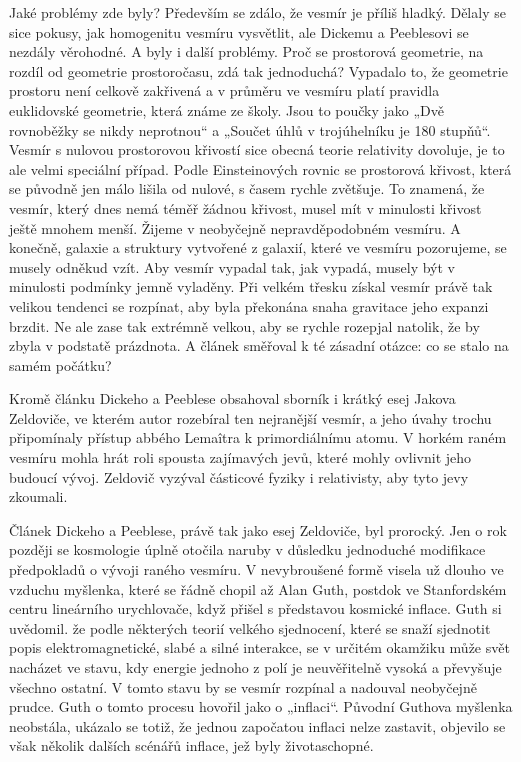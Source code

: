   Jaké problémy zde byly? Především se zdálo, že vesmír je příliš hladký. Dělaly se sice pokusy, jak
  homogenitu vesmíru vysvětlit, ale Dickemu a Peeblesovi se nezdály věrohodné. A byly i další
  problémy. Proč se prostorová geometrie, na rozdíl od geometrie prostoročasu, zdá tak jednoduchá?
  Vypadalo to, že geometrie prostoru není celkově zakřivená a v průměru ve vesmíru platí pravidla
  euklidovské geometrie, která známe ze školy. Jsou to poučky jako „Dvě rovnoběžky se nikdy
  neprotnou“ a „Součet úhlů v trojúhelníku je 180 stupňů“. Vesmír s nulovou prostorovou křivostí
  sice obecná teorie relativity dovoluje, je to ale velmi speciální případ. Podle Einsteinových
  rovnic se prostorová křivost, která se původně jen málo lišila od nulové, s časem rychle zvětšuje.
  To znamená, že vesmír, který dnes nemá téměř žádnou křivost, musel mít v minulosti křivost ještě
  mnohem menší. Žijeme v neobyčejně nepravděpodobném vesmíru. A konečně, galaxie a struktury
  vytvořené z galaxií, které ve vesmíru pozorujeme, se musely odněkud vzít. Aby vesmír vypadal tak,
  jak vypadá, musely být v minulosti podmínky jemně vyladěny. Při velkém třesku získal vesmír právě
  tak velikou tendenci se rozpínat, aby byla překonána snaha gravitace jeho expanzi brzdit. Ne ale
  zase tak extrémně velkou, aby se rychle rozepjal natolik, že by zbyla v podstatě prázdnota. A
  článek směřoval k té zásadní otázce: co se stalo na samém počátku? 
  
  Kromě článku Dickeho a Peeblese obsahoval sborník i krátký esej Jakova Zeldoviče, ve kterém autor
  rozebíral ten nejranější vesmír, a jeho úvahy trochu připomínaly přístup abbého Lemaîtra k
  primordiálnímu atomu. V horkém raném vesmíru mohla hrát roli spousta zajímavých jevů, které mohly
  ovlivnit jeho budoucí vývoj. Zeldovič vyzýval částicové fyziky i relativisty, aby tyto jevy
  zkoumali. 
  
  Článek Dickeho a Peeblese, právě tak jako esej Zeldoviče, byl prorocký. Jen o rok později se
  kosmologie úplně otočila naruby v důsledku jednoduché modifikace předpokladů o vývoji raného
  vesmíru. V nevybroušené formě visela už dlouho ve vzduchu myšlenka, které se řádně chopil až Alan
  Guth, postdok ve Stanfordském centru lineárního urychlovače, když přišel s představou kosmické
  inflace. Guth si uvědomil. že podle některých teorií velkého sjednocení, které se snaží sjednotit
  popis elektromagnetické, slabé a silné interakce, se v určitém okamžiku může svět nacházet ve
  stavu, kdy energie jednoho z polí je neuvěřitelně vysoká a převyšuje všechno ostatní. V tomto
  stavu by se vesmír rozpínal a nadouval neobyčejně prudce. Guth o tomto procesu hovořil jako o
  „inflaci“. Původní Guthova myšlenka neobstála, ukázalo se totiž, že jednou započatou inflaci nelze
  zastavit, objevilo se však několik dalších scénářů inflace, jež byly životaschopné. 
  
